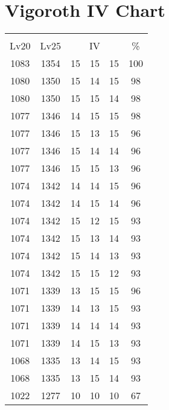 \documentclass{article}%
\begin{document}
%
\normalsize%
\section{Vigoroth IV Chart}%
\label{sec:Vigoroth IV Chart}%
\renewcommand{\arraystretch}{1.5}%
\begin{tabular}{|c|c|c|c|c|c|}%
\hline%
\multicolumn{6}{|c|}{\textcolor{white}{ 
\linebreak{Vigoroth}
}%
\cellcolor{black}}\\%
\multicolumn{1}{|c}{Lv20}&\multicolumn{1}{c|}{Lv25}&\multicolumn{3}{c|}{IV}&\multicolumn{1}{|c|}{\%}\\%
\hline%
\rowcolor{color100}%
1083&1354&15&15&15&100\\%
\hline%
\rowcolor{color98}%
1080&1350&15&14&15&98\\%
\hline%
\rowcolor{color98}%
1080&1350&15&15&14&98\\%
\hline%
\rowcolor{color98}%
1077&1346&14&15&15&98\\%
\hline%
\rowcolor{color96}%
1077&1346&15&13&15&96\\%
\hline%
\rowcolor{color96}%
1077&1346&15&14&14&96\\%
\hline%
\rowcolor{color96}%
1077&1346&15&15&13&96\\%
\hline%
\rowcolor{color96}%
1074&1342&14&14&15&96\\%
\hline%
\rowcolor{color96}%
1074&1342&14&15&14&96\\%
\hline%
\rowcolor{color93}%
1074&1342&15&12&15&93\\%
\hline%
\rowcolor{color93}%
1074&1342&15&13&14&93\\%
\hline%
\rowcolor{color93}%
1074&1342&15&14&13&93\\%
\hline%
\rowcolor{color93}%
1074&1342&15&15&12&93\\%
\hline%
\rowcolor{color96}%
1071&1339&13&15&15&96\\%
\hline%
\rowcolor{color93}%
1071&1339&14&13&15&93\\%
\hline%
\rowcolor{color93}%
1071&1339&14&14&14&93\\%
\hline%
\rowcolor{color93}%
1071&1339&14&15&13&93\\%
\hline%
\rowcolor{color93}%
1068&1335&13&14&15&93\\%
\hline%
\rowcolor{color93}%
1068&1335&13&15&14&93\\%
\hline%
\rowcolor{color91}%
1022&1277&10&10&10&67\\%
\end{tabular}

%
\end{document}
